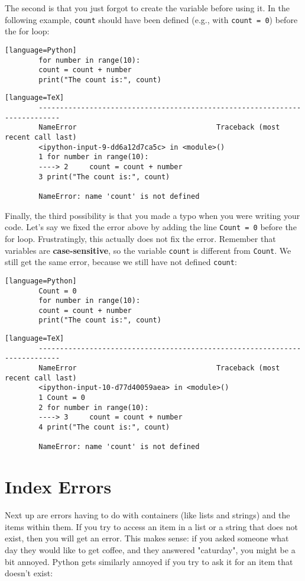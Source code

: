 \documentclass{article}
\begin{document}
	The second is that you just forgot to create the variable before using it. In the following example, \texttt{count} should have been defined (e.g., with \texttt{count = 0}) before the for loop:
	
	\begin{verbatim}[language=Python]
		for number in range(10):
		count = count + number
		print("The count is:", count)
	\end{verbatim}
	
	\begin{verbatim}[language=TeX]
		---------------------------------------------------------------------------
		NameError                                 Traceback (most recent call last)
		<ipython-input-9-dd6a12d7ca5c> in <module>()
		1 for number in range(10):
		----> 2     count = count + number
		3 print("The count is:", count)
		
		NameError: name 'count' is not defined
	\end{verbatim}
	
	Finally, the third possibility is that you made a typo when you were writing your code. Let's say we fixed the error above by adding the line \texttt{Count = 0} before the for loop. Frustratingly, this actually does not fix the error. Remember that variables are \textbf{case-sensitive}, so the variable \texttt{count} is different from \texttt{Count}. We still get the same error, because we still have not defined \texttt{count}:
	
	\begin{verbatim}[language=Python]
		Count = 0
		for number in range(10):
		count = count + number
		print("The count is:", count)
	\end{verbatim}
	
	\begin{verbatim}[language=TeX]
		---------------------------------------------------------------------------
		NameError                                 Traceback (most recent call last)
		<ipython-input-10-d77d40059aea> in <module>()
		1 Count = 0
		2 for number in range(10):
		----> 3     count = count + number
		4 print("The count is:", count)
		
		NameError: name 'count' is not defined
	\end{verbatim}
	
	\section{Index Errors}
	
	Next up are errors having to do with containers (like lists and strings) and the items within them. If you try to access an item in a list or a string that does not exist, then you will get an error. This makes sense: if you asked someone what day they would like to get coffee, and they answered "caturday", you might be a bit annoyed. Python gets similarly annoyed if you try to ask it for an item that doesn't exist:
	
\end{document}
